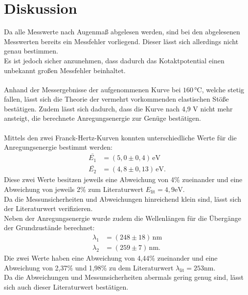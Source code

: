 \section{Diskussion}
\label{sec:Diskussion}

Da alle Messwerte nach Augenmaß abgelesen werden, sind bei den abgelesenen Messwerten
bereits ein Messfehler vorliegend. Dieser lässt sich allerdings nicht genau bestimmen.\\
Es ist jedoch sicher anzunehmen, dass dadurch das Kotaktpotential einen unbekannt großen
Messfehler beinhaltet.\\ \\
Anhand der Messergebnisse der aufgenommenen Kurve bei $160 \, \si{\celsius}$, welche 
stetig fallen, lässt sich
die Theorie der vermehrt vorkommenden elastischen Stöße bestätigen. Zudem lässt sich dadurch,
dass die Kurve nach 4,9 V nicht mehr ansteigt, die berechnete Anregungsenergie zur Genüge
bestätigen.\\ \\
Mittels den zwei Franck-Hertz-Kurven konnten unterschiedliche Werte für die Anregungsenergie
bestimmt werden:
\begin{align*}
    \bar{E_1}&=(5,0 \pm 0,4) \, \si{\electronvolt} \\
    \bar{E_2}&=(4,8 \pm 0,13) \, \si{\electronvolt}.
\end{align*}
Diese zwei Werte besitzen jeweils eine Abweichung von 4\% zueinander und eine Abweichung von
jeweils 2\% zum Literaturwert $E_{\mathrm{lit}} = 4,9 \si{\electronvolt}$\cite{lit}.\\
Da die Messunsicherheiten und Abweichungen hinreichend klein sind, lässt sich der Literaturwert
verifizieren.\\
Neben der Anregungsenergie wurde zudem die Wellenlängen für die Übergänge der Grundzustände 
berechnet:
\begin{align*}
    \lambda_1&=(248 \pm 18) \, \si{\nano\meter} \\
    \lambda_2&=(259 \pm 7) \, \si{\nano\meter}.
\end{align*}
Die zwei Werte haben eine Abweichung von 4,44\% zueinander und eine Abweichung von 2,37\% und
1,98\% zu dem Literaturwert $\lambda_{\mathrm{lit}} = 253 \si{\nano\meter}$\cite{lit}.\\
Da die Abweichungen und Messunsicherheiten abermals gering genug sind, lässt sich auch
dieser Literaturwert bestätigen.\\
